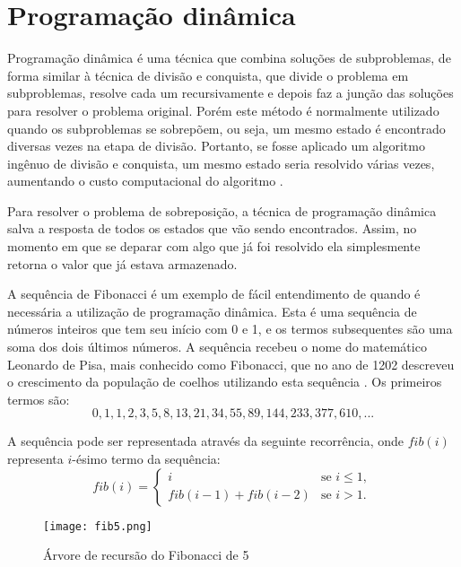 \section{Programação dinâmica}
\label{sec:pd}

Programação dinâmica é uma técnica que combina soluções de subproblemas, de forma similar à técnica de divisão e conquista, que divide o problema em subproblemas, resolve cada um recursivamente e depois faz a junção das soluções para resolver o problema original. Porém este método é normalmente utilizado quando os subproblemas se sobrepõem, ou seja, um mesmo estado é encontrado diversas vezes na etapa de divisão. Portanto, se fosse aplicado um algoritmo ingênuo de divisão e conquista, um mesmo estado seria resolvido várias vezes, aumentando o custo computacional do algoritmo \cite{Cormen09a}. 

Para resolver o problema de sobreposição, a técnica de programação dinâmica salva a resposta de todos os estados que vão sendo encontrados. Assim, no momento em que se deparar com algo que já foi resolvido ela simplesmente retorna o valor que já estava armazenado. 

A sequência de Fibonacci é um exemplo de fácil entendimento de quando é necessária a utilização de programação dinâmica. Esta é uma sequência de números inteiros que tem seu início com 0 e 1, e os termos subsequentes são uma soma dos dois últimos números. A sequência recebeu o nome do matemático Leonardo de Pisa, mais conhecido como Fibonacci, que no ano de 1202 descreveu o crescimento da população de coelhos utilizando esta sequência \cite{LiveScience2013}. Os primeiros termos são:
\begin{equation}
0, 1, 1, 2, 3, 5, 8, 13, 21, 34, 55, 89, 144, 233, 377, 610, ...
\label{eq:fib}
\end{equation}

A sequência pode ser representada através da seguinte recorrência, onde $fib(i)$ representa $i$-ésimo termo da sequência:
\begin{equation}
fib(i)=
\begin{cases}
i &\text{se } i \leq{1},\\
fib(i - 1) + fib(i - 2) &\text{se } i > {1}.
\end{cases}
\label{eq:fibrecorrence}
\end{equation}

\begin{figure}[H]
	\centering
	\caption[Árvore de recursão do Fibonacci de 5]{Árvore de recursão do Fibonacci de 5}
	\texttt{[image: fib5.png]} %
	\label{fig:fib5}
\end{figure}


